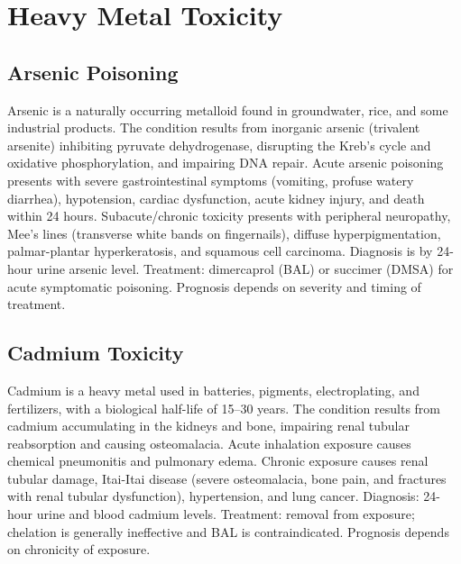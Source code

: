 \section{Heavy Metal Toxicity}








\label{sec:Heavy Metal Toxicity}

\subsection{Arsenic Poisoning}
\label{sec:Arsenic Poisoning}
Arsenic is a naturally occurring metalloid found in groundwater, rice, and some industrial products. The condition results from inorganic arsenic (trivalent arsenite) inhibiting pyruvate dehydrogenase, disrupting the Kreb's cycle and oxidative phosphorylation, and impairing DNA repair. Acute arsenic poisoning presents with severe gastrointestinal symptoms (vomiting, profuse watery diarrhea), hypotension, cardiac dysfunction, acute kidney injury, and death within 24 hours. Subacute/chronic toxicity presents with peripheral neuropathy, Mee's lines (transverse white bands on fingernails), diffuse hyperpigmentation, palmar-plantar hyperkeratosis, and squamous cell carcinoma. Diagnosis is by 24-hour urine arsenic level. Treatment: dimercaprol (BAL) or succimer (DMSA) for acute symptomatic poisoning. Prognosis depends on severity and timing of treatment.

\subsection{Cadmium Toxicity}
\label{sec:Cadmium Toxicity}
Cadmium is a heavy metal used in batteries, pigments, electroplating, and fertilizers, with a biological half-life of 15--30 years. The condition results from cadmium accumulating in the kidneys and bone, impairing renal tubular reabsorption and causing osteomalacia. Acute inhalation exposure causes chemical pneumonitis and pulmonary edema. Chronic exposure causes renal tubular damage, Itai-Itai disease (severe osteomalacia, bone pain, and fractures with renal tubular dysfunction), hypertension, and lung cancer. Diagnosis: 24-hour urine and blood cadmium levels. Treatment: removal from exposure; chelation is generally ineffective and BAL is contraindicated. Prognosis depends on chronicity of exposure.

